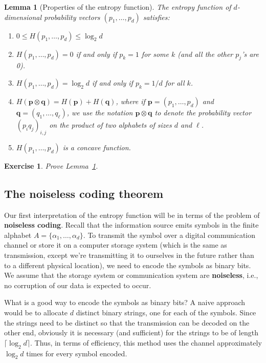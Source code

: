 \documentclass[12pt]{article}
\newtheorem{lem}[thm]{Lemma}
\newtheorem{exercise}[thm]{Exercise}
\theoremstyle{example}
\begin{document}
\begin{lem}[Properties of the entropy function] 
\label{lem-entropy-properties}
The entropy function of $d$-dimensional probability vectors $(p_1,\ldots,p_d)$ satisfies:
\begin{enumerate}
\item $0 \le H(p_1,\ldots,p_d) \le \log_2 d$
\item $H(p_1,\ldots,p_d)=0$ if and only if $p_k=1$ for some $k$ (and all the other $p_j$'s are 0).
\item $H(p_1,\ldots,p_d)=\log_2 d$ if and only if $p_k=1/d$ for all $k$.
\item $H(\mathbf{p}\otimes \mathbf{q}) = H(\mathbf{p}) + H(\mathbf{q})$, where if $\mathbf{p}=(p_1,\ldots,p_d)$ and $\mathbf{q}=(q_1,\ldots,q_\ell)$, we use the notation $\mathbf{p}\otimes\mathbf{q}$ to denote the probability vector $(p_i q_j)_{i,j}$ on the product of two alphabets of sizes $d$ and $\ell$.
\item $H(p_1,\ldots,p_d)$ is a concave function.
\end{enumerate}
\end{lem}

\begin{exercise}
Prove Lemma~\ref{lem-entropy-properties}.
\end{exercise}

\subsection{The noiseless coding theorem}

Our first interpretation of the entropy function will be in terms of the problem of \textbf{noiseless coding}. Recall that the information source emits symbols in the finite alphabet $A=\{\alpha_1,\ldots,\alpha_d\}$. To transmit the symbol over a digital communication channel or store it on a computer storage system (which is the same as transmission, except we're transmitting it to ourselves in the future rather than to a different physical location), we need to encode the symbols as binary bits. We assume that the storage system or communication system are \textbf{noiseless}, i.e., no corruption of our data is expected to occur.

What is a good way to encode the symbols as binary bits? A naive approach would be to allocate $d$ distinct binary strings, one for each of the symbols. Since the strings need to be distinct so that the transmission can be decoded on the other end, obviously it is necessary (and sufficient) for the strings to be of length $\lceil \log_2 d\rceil$. Thus, in terms of efficiency, this method uses the channel approximately $\log_2 d$ times for every symbol encoded.
\end{document}
